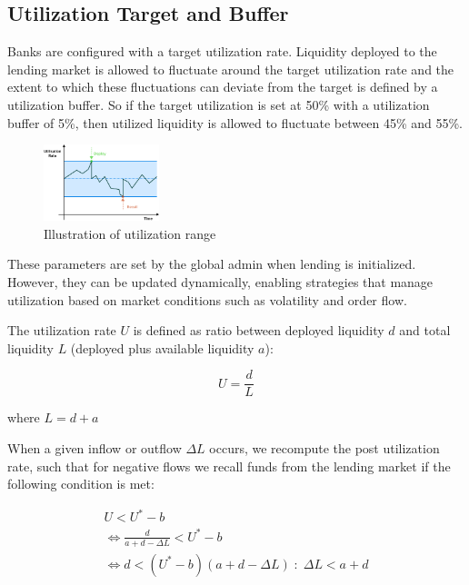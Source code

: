 \documentclass[sigconf,nonacm,prologue,table]{acmart}
\numberwithin{equation}{section}
\theoremstyle{definition}
\theoremstyle{remark}
\begin{document}
\subsection{Utilization Target and Buffer} \label{utilizationtargetbuffer}

Banks are configured with a target utilization rate. Liquidity deployed to the lending market is allowed to fluctuate around the target utilization rate and the extent to which these fluctuations can deviate from the target is defined by a utilization buffer. So if the target utilization is set at 50\% with a utilization buffer of 5\%, then utilized liquidity is allowed to fluctuate between 45\% and 55\%.

\begin{figure}[htbp]
  \centering
  \includegraphics[width=0.3\textwidth]{assets/utilization.png}
  \caption{Illustration of utilization range}
  \label{fig:utilization}
\end{figure}

These parameters are set by the global admin when lending is initialized. However, they can be updated dynamically, enabling strategies that manage utilization based on market conditions such as volatility and order flow.

The utilization rate $U$ is defined as ratio between deployed liquidity $d$ and total liquidity $L$ (deployed plus available liquidity $a$):

\begin{equation}
U = \frac{d}{L}
\tag{2.2.1}
\end{equation}

where $L = d + a$

When a given inflow or outflow $\Delta L$ occurs, we recompute the post utilization rate, such that for negative flows we recall funds from the lending market if the following condition is met:

\begin{gather*}
    U < U^* - b \\
    \iff \frac{d}{a + d - \Delta L} < U^* - b \\
    \iff d < (U^* - b)(a + d - \Delta L) \; : \; \Delta L < a + d
\tag{2.2.2}
\end{gather*}
\end{document}
